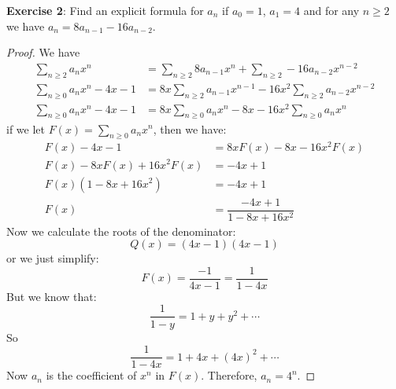 \documentclass{article}
\begin{document}
\textbf{Exercise 2}: Find an explicit formula for $a_{n}$ if $a_{0} = 1$, $a_{1} = 4$ and for any $n \geq 2$ we have $a_{n} = 8a_{n - 1} - 16a_{n - 2}$.
    \begin{proof}
        We have 
            \begin{align*}
                \sum_{n \geq 2}a_{n}x^{n} &= \sum_{n \geq 2}8a_{n - 1}x^{n} + \sum_{n \geq 2} -16a_{n - 2}x^{n - 2} \\
                \sum_{n \geq 0}a_{n}x^{n} - 4x - 1 &= 8x\sum_{n \geq 2}a_{n - 1}x^{n - 1} - 16x^{2}\sum_{n \geq 2}a_{n - 2}x^{n - 2} \\
                \sum_{n \geq 0}a_{n}x^{n} - 4x - 1 &= 8x \sum_{n \geq 0}a_{n}x^{n} - 8x - 16x^{2}\sum_{n \geq 0}a_{n}x^{n}
            \end{align*}
        if we let $F(x) = \sum_{n \geq 0}a_{n}x^{n}$, then we have:
            \begin{align*}
                F(x) - 4x - 1 &= 8xF(x) - 8x - 16x^{2}F(x) \\
                F(x) - 8xF(x) + 16x^{2}F(x) &= -4x + 1 \\
                F(x)(1 - 8x + 16x^{2}) &= -4x + 1 \\
                F(x) &= \dfrac{-4x + 1}{1 - 8x + 16x^{2}}
            \end{align*}
        Now we calculate the roots of the denominator:
            \begin{equation*}
                Q(x) = (4x - 1)(4x - 1)
            \end{equation*}
        or we just simplify:
            \begin{equation*}
                F(x) = \dfrac{-1}{4x - 1} = \dfrac{1}{1 - 4x}
            \end{equation*}
        But we know that:
            \begin{equation*}
                \dfrac{1}{1 - y} = 1 + y + y^{2} + \cdots 
            \end{equation*}
        So 
            \begin{equation*}
                \dfrac{1}{1 - 4x} = 1 + 4x + (4x)^{2} + \cdots  
            \end{equation*}
        Now $a_{n}$ is the coefficient of $x^{n}$ in $F(x)$. Therefore, $a_{n} = 4^{n}$.
    \end{proof}
\end{document}
